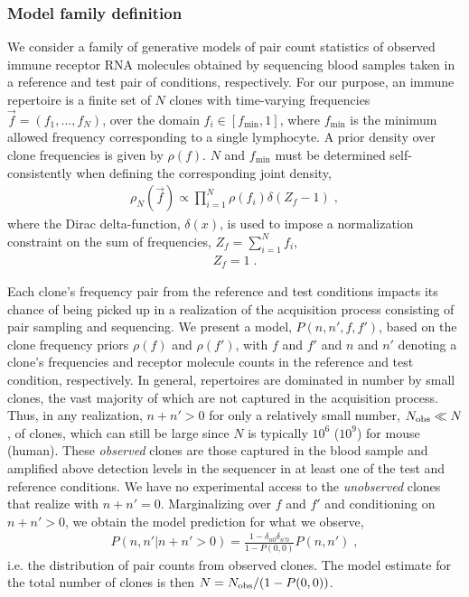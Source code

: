 \documentclass[letterpaper,english,prl,reprint,longbibliography]{revtex4-1} %
\begin{document}
\subsubsection*{Model family definition}
We consider a family of generative models of pair count statistics of observed immune receptor RNA molecules obtained by sequencing blood samples taken in a reference and test pair of conditions, respectively. 
For our purpose, an immune repertoire is a finite set of $N$ clones with time-varying frequencies $\vec{f}=(f_1,\dots,f_N)$, over the domain $f_i\in[f_{\textrm{min}},1]$, where $f_{\textrm{min}}$ is the minimum allowed frequency corresponding to a single lymphocyte. A prior density over clone frequencies is given by $\rho(f)$. $N$ and $f_{\textrm{min}}$ must be determined self-consistently when defining the corresponding joint density, 
\begin{eqnarray}
	\rho_N(\vec{f})\propto \prod_{i=1}^N\rho(f_i)\delta(Z_f-1)\;,\label{eq:jointf}
\end{eqnarray}
where the Dirac delta-function, $\delta(x)$, is used to impose a normalization constraint on the sum of frequencies, $Z_f=\sum_{i=1}^N f_i$, 
\begin{align}
  Z_f=1\;. \label{eq:norm_constr}
\end{align}

Each clone's frequency pair from the reference and test conditions impacts its chance of being picked up in a realization of the acquisition process consisting of pair sampling and sequencing.
We present a model, $P(n,n',f,f')$, based on the clone frequency priors $\rho(f)$ and $\rho(f')$, with $f$ and $f'$ and $n$ and $n'$ denoting a clone's frequencies and receptor molecule counts in the reference and test condition, respectively. 
In general, repertoires are dominated in number by small clones, the vast majority of which are not captured in the acquisition process. 
Thus, in any realization, $n+n'>0$ for only a relatively small number, $N_{\textrm{\textrm{obs}}}\ll N$, of clones, which can still be large since $N$ is typically $ 10^6$ ($10^9$) for mouse (human). 
These \emph{observed} clones are those captured in the blood sample and amplified above detection levels in the sequencer in at least one of the test and reference conditions. 
We have no experimental access to the \emph{unobserved} clones that realize with $n+n'=0$. 
Marginalizing over $f$ and $f'$ and conditioning on $n+n'>0$, we obtain the model prediction for what we observe, 
\begin{align}
	P(n,n'|n+n'>0)=\frac{1-\delta_{n0}\delta_{n'0}}{1-P(0,0)}P(n,n')\;,
\end{align} 
i.e. the distribution of pair counts from observed clones. The model estimate for the total number of clones is then $N=N_{\textrm{\textrm{obs}}}/(1-P(0,0))$. 
\end{document}
